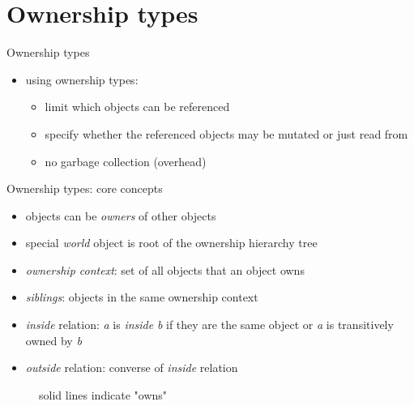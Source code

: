 \documentclass[handout]{beamer}
\begin{document}
\section{Ownership types}

\begin{frame}{Ownership types}
\begin{itemize}
  \item using ownership types:
  \begin{itemize}
    \item limit which objects can be referenced
    \item specify whether the referenced objects may be mutated or just read from
    \item no garbage collection (overhead)
  \end{itemize}
\end{itemize}
\end{frame}


\begin{frame}{Ownership types: core concepts}
\begin{itemize}
  \item objects can be \emph{owners} of other objects
  \item special \emph{world} object is root of the ownership hierarchy tree
  \item \emph{ownership context}: set of all objects that an object owns
  \item \emph{siblings}: objects in the same ownership context
  \item \emph{inside} relation: \emph{a} is \emph{inside} \emph{b} if they are the same object or \emph{a} is transitively owned by \emph{b}
  \item \emph{outside} relation: converse of \emph{inside} relation
\end{itemize}

\begin{figure}[fragile]

  \caption{solid lines indicate "owns"}
\end{figure}
\end{frame}
\end{document}
